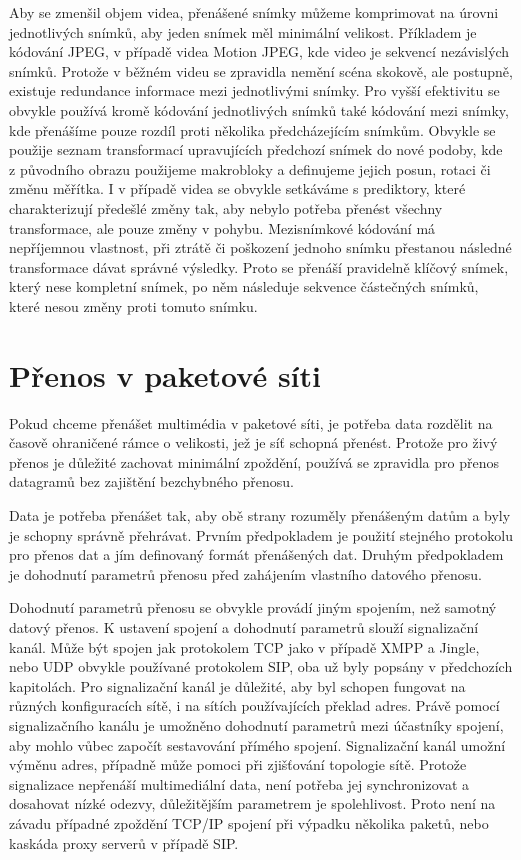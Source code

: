 Aby se zmenšil objem videa, přenášené snímky můžeme komprimovat na úrovni
jednotlivých snímků, aby jeden snímek měl minimální velikost. Příkladem je
kódování JPEG, v případě videa Motion JPEG, kde video je sekvencí nezávislých snímků. Protože v běžném videu se zpravidla nemění scéna skokově, ale postupně, existuje redundance informace mezi jednotlivými snímky. Pro vyšší efektivitu se obvykle používá kromě kódování jednotlivých snímků také kódování mezi snímky, kde přenášíme pouze rozdíl proti několika
předcházejícím snímkům. Obvykle se použije seznam transformací upravujících 
předchozí snímek do nové podoby, kde z původního obrazu použijeme makrobloky
a definujeme jejich posun, rotaci či změnu měřítka. I v případě videa se 
obvykle setkáváme s prediktory, které charakterizují předešlé změny tak,
aby nebylo potřeba přenést všechny transformace, ale pouze změny v pohybu.
Mezisnímkové kódování má nepříjemnou vlastnost, při ztrátě či poškození jednoho snímku
přestanou následné transformace dávat správné výsledky. Proto se přenáší pravidelně klíčový snímek, který nese kompletní snímek, po něm následuje sekvence částečných snímků, které nesou změny proti tomuto snímku.

\section{Přenos v paketové síti}
Pokud chceme přenášet multimédia v paketové síti, je potřeba data rozdělit
na časově ohraničené rámce o velikosti, jež je síť schopná přenést. Protože
pro živý přenos je důležité zachovat minimální zpoždění, používá se zpravidla
pro přenos datagramů bez zajištění bezchybného přenosu.

Data je potřeba přenášet tak, aby obě strany rozuměly přenášeným datům a byly
je schopny správně přehrávat. Prvním předpokladem je použití stejného 
protokolu pro přenos dat a jím definovaný formát přenášených dat. Druhým předpokladem je dohodnutí parametrů přenosu před zahájením vlastního datového
přenosu.

Dohodnutí parametrů přenosu se obvykle provádí jiným spojením, než samotný
datový přenos. K ustavení spojení a dohodnutí parametrů slouží signalizační
kanál. Může být spojen jak protokolem TCP jako v případě XMPP a Jingle,
nebo UDP obvykle používané protokolem SIP, oba už byly popsány v předchozích kapitolách. Pro signalizační kanál je důležité, aby byl schopen fungovat 
na různých konfiguracích sítě, i na sítích používajících překlad adres. Právě
pomocí signalizačního kanálu je umožněno dohodnutí parametrů mezi účastníky
spojení, aby mohlo vůbec započít sestavování přímého spojení. Signalizační
kanál umožní výměnu adres, případně může pomoci při zjišťování topologie
 sítě. Protože signalizace nepřenáší multimediální data, není potřeba jej 
 synchronizovat a dosahovat nízké odezvy, důležitějším parametrem je spolehlivost. Proto není na závadu případné zpoždění TCP/IP spojení při výpadku několika paketů, nebo kaskáda proxy serverů v případě SIP.
 
